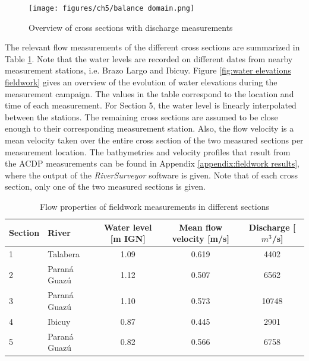 \begin{figure}[H]
    \centering
    \texttt{[image: figures/ch5/balance domain.png]}
    \caption{Overview of cross sections with discharge measurements}
    \label{fig:cross section domain}
\end{figure}

The relevant flow measurements of the different cross sections are summarized in Table \ref{tab:discharges fieldwork}. Note that the water levels are recorded on different dates from nearby measurement stations, i.e. Brazo Largo and Ibicuy. Figure \ref{fig:water elevations fieldwork} gives an overview of the evolution of water elevations during the measurement campaign. The values in the table correspond to the location and time of each measurement. For Section 5, the water level is linearly interpolated between the stations. The remaining cross sections are assumed to be close enough to their corresponding measurement station.  Also, the flow velocity is a mean velocity taken over the entire cross section of the two measured sections per measurement location. The bathymetries and velocity profiles that result from the ACDP measurements can be found in Appendix \ref{appendix:fieldwork results}, where the output of the \textit{RiverSurveyor} software is given. Note that of each cross section, only one of the two measured sections is given. 

\begin{table}[H]
    \centering
    \renewcommand{\arraystretch}{1.2} %
    \setlength{\tabcolsep}{8pt}       %
    \caption{Flow properties of fieldwork measurements in different sections}
    \begin{tabular}{llccc}
        \toprule
        Section & River & Water level [m IGN] & Mean flow velocity [m/s] & Discharge [$m^3$/s] \\
        \midrule
        1 & Talabera       & 1.09 & 0.619 & 4402 \\
        2 & Paraná Guazú   & 1.12 & 0.507 & 6562 \\
        3 & Paraná Guazú   & 1.10 & 0.573 & 10748 \\
        \midrule
        4 & Ibicuy & 0.87 & 0.445 & 2901 \\
        5 & Paraná Guazú   & 0.82 & 0.566 & 6758 \\
        \bottomrule
    \end{tabular}
    \label{tab:discharges fieldwork}
\end{table}

